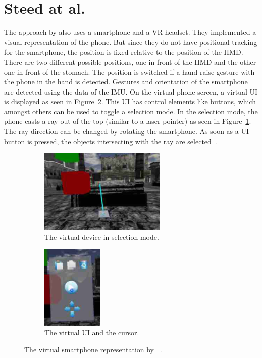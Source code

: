 \section{Steed at al.}\label{section:steed-2013}
The approach by \citeauthor{Steed.2013} also uses a smartphone and a \ac{VR} headset. They implemented a visual representation of the phone. But since they do not have positional tracking for the smartphone, the position is fixed relative to the position of the \ac{HMD}. There are two different possible positions, one in front of the \ac{HMD} and the other one in front of the stomach. The position is switched if a hand raise gesture with the phone in the hand is detected. Gestures and orientation of the smartphone are detected using the data of the \ac{IMU}. On the virtual phone screen, a virtual \ac{UI} is displayed as seen in Figure~\ref{fig:steed-2013-ui}. This \ac{UI} has control elements like buttons, which amongst others can be used to toggle a selection mode. In the selection mode, the phone casts a ray out of the top (similar to a laser pointer) as seen in Figure~\ref{fig:steed-2013-laser-pointer}. The ray direction can be changed by rotating the smartphone. As soon as a \ac{UI} button is pressed, the objects intersecting with the ray are selected~\cite{Steed.2013}.

\begin{figure}[H]
  \centering
  \begin{subfigure}{0.45\textwidth}%
    \centering%
    \includegraphics[height=4cm]{figures/steed_2013_laser_pointer.png}
    \caption{The virtual device in selection mode.}\label{fig:steed-2013-laser-pointer}%
  \end{subfigure}%
  \hspace{0.1\textwidth}%
  \begin{subfigure}{0.45\textwidth}%
    \centering%
    \includegraphics[height=4cm]{figures/steed_2013_ui.png}
    \caption{The virtual \ac{UI} and the cursor.}\label{fig:steed-2013-ui}
  \end{subfigure}%
  \caption[Virtual smartphone representation by Steep et al.]{The virtual smartphone representation by \citeauthor{Steed.2013}~\protect\cite[43]{Steed.2013}.}\label{fig:steed-2013}
\end{figure}